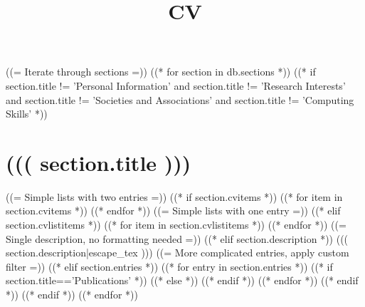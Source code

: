 \documentclass[10pt,a4paper,sans]{moderncv}
\title{CV}
\begin{document}
  \makecvtitle
  ((= Iterate through sections =))
  ((* for section in db.sections *))
  ((* if section.title != 'Personal Information' and section.title != 'Research Interests' and section.title != 'Societies and Associations' and section.title != 'Computing Skills' *))
  \section{((( section.title )))}
  ((= Simple lists with two entries =))
  ((* if section.cvitems *))
  ((* for item in section.cvitems *))
  ((* endfor *))
  ((= Simple lists with one entry =))
  ((* elif section.cvlistitems *))
  ((* for item in section.cvlistitems *))
  ((* endfor *))
  ((= Single description, no formatting needed =))
  ((* elif section.description *))
  ((( section.description|escape_tex )))
  ((= More complicated entries, apply custom filter =))
  ((* elif section.entries *))
  ((* for entry in section.entries *))
  ((* if section.title=='Publications' *))
  ((* else *))
  ((* endif *))
  ((* endfor *))
  ((* endif *))
  ((* endif *))
  ((* endfor *))
\end{document}
